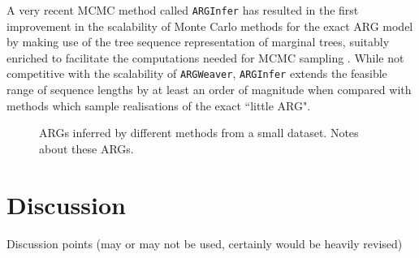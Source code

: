 \documentclass{article}
\begin{document}
A very recent MCMC method called \texttt{ARGInfer} has resulted in the first
improvement in the scalability of Monte Carlo methods for the exact ARG model
by making use of the tree sequence representation of marginal trees, suitably enriched
to facilitate the computations needed for MCMC sampling \citep{mahmoudi2021inference}.
While not competitive with the scalability of \texttt{ARGWeaver}, \texttt{ARGInfer} extends
the feasible range of sequence lengths by at least an order of magnitude when
compared with methods which sample realisations of the exact ``little ARG".


\begin{figure}
\vspace{5em}
\caption{\label{fig-inferred-args}
ARGs inferred by different methods from a small dataset. Notes about these
ARGs.
}
\end{figure}

\section*{Discussion}

Discussion points (may or may not be used, certainly would be heavily revised)
\end{document}
